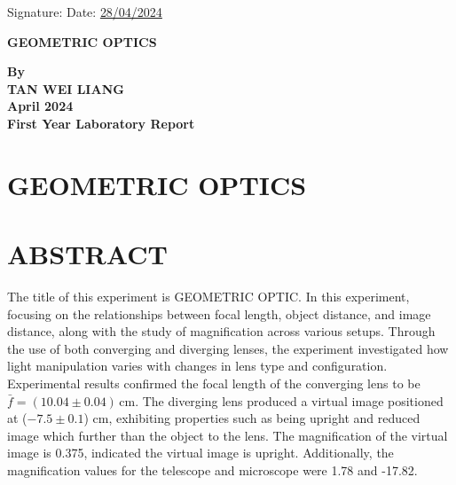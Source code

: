 \documentclass[a4paper,11pt]{article}
\begin{document}
\noindent Signature: \hrulefill \hfill Date: \uline{28/04/2024}

\newpage
\begin{center}
\vspace*{1cm}
\textbf{\Large GEOMETRIC OPTICS}

\vspace{3.0cm}
\textbf{By}\\

\vspace{3.0cm}
\textbf{TAN WEI LIANG} \\

\vspace{3.0cm}
\textbf{April 2024}\\

\vfill
\textbf{\large First Year Laboratory Report}
\end{center}


\newpage
{}
\section*{\large \center GEOMETRIC OPTICS}
\section*{\large \center ABSTRACT}
\label{sec:ABSTRACT}
The title of this experiment is GEOMETRIC OPTIC. In this experiment, focusing on the relationships between focal length, object distance, and image distance, along with the study of magnification across various setups. Through the use of both converging and diverging lenses, the experiment investigated how light manipulation varies with changes in lens type and configuration. Experimental results confirmed the focal length of the converging lens to be \( \bar{f} = (10.04 \pm 0.04) \, \text{cm} \). The diverging lens produced a virtual image positioned at (\(-7.5\pm 0.1\)) cm, exhibiting properties such as being upright and reduced image which further than the object to the lens. The magnification of the virtual image is 0.375, indicated the virtual image is upright. Additionally, the magnification values for the telescope and microscope were 1.78 and -17.82.
\newpage 
{}
\end{document}
